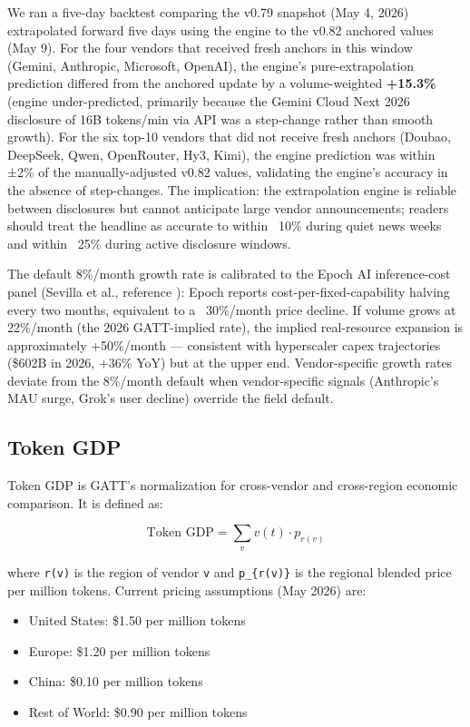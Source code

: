 \documentclass[11pt,a4paper]{article}
\begin{document}
We ran a five-day backtest comparing the v0.79 snapshot (May 4, 2026) extrapolated forward five days using the engine to the v0.82 anchored values (May 9). For the four vendors that received fresh anchors in this window (Gemini, Anthropic, Microsoft, OpenAI), the engine's pure-extrapolation prediction differed from the anchored update by a volume-weighted \textbf{+15.3\%} (engine under-predicted, primarily because the Gemini Cloud Next 2026 disclosure of 16B tokens/min via API was a step-change rather than smooth growth). For the six top-10 vendors that did not receive fresh anchors (Doubao, DeepSeek, Qwen, OpenRouter, Hy3, Kimi), the engine prediction was within ±2\% of the manually-adjusted v0.82 values, validating the engine's accuracy in the absence of step-changes. The implication: the extrapolation engine is reliable between disclosures but cannot anticipate large vendor announcements; readers should treat the headline as accurate to within ~10\% during quiet news weeks and within ~25\% during active disclosure windows.

The default 8\%/month growth rate is calibrated to the Epoch AI inference-cost panel (Sevilla et al., reference \cite{epoch2026inference}): Epoch reports cost-per-fixed-capability halving every two months, equivalent to a ~30\%/month price decline. If volume grows at 22\%/month (the 2026 GATT-implied rate), the implied real-resource expansion is approximately +50\%/month --- consistent with hyperscaler capex trajectories (\$602B in 2026, +36\% YoY) but at the upper end. Vendor-specific growth rates deviate from the 8\%/month default when vendor-specific signals (Anthropic's MAU surge, Grok's user decline) override the field default.

\subsection{Token GDP}

Token GDP is GATT's normalization for cross-vendor and cross-region economic comparison. It is defined as:

\begin{equation*}
 \text{Token GDP} = \sum_v v(t) \cdot p_{r(v)} 
\end{equation*}

where \texttt{r(v)} is the region of vendor \texttt{v} and \texttt{p\_\{r(v)\}} is the regional blended price per million tokens. Current pricing assumptions (May 2026) are:

\begin{itemize}
  \item United States: \$1.50 per million tokens
  \item Europe: \$1.20 per million tokens
  \item China: \$0.10 per million tokens
  \item Rest of World: \$0.90 per million tokens
\end{itemize}
\end{document}
